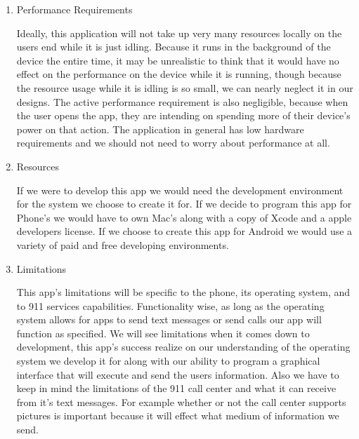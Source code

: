 \documentclass[12pt]{article}
\begin{document}
\begin{enumerate}
\item Performance Requirements

Ideally, this application will not take up very many resources locally on the users end while it is just idling. Because it runs in the background of the device the entire time, it may be unrealistic to think that it would have no effect on the performance on the device while it is running, though because the resource usage while it is idling is so small, we can nearly neglect it in our designs. The active performance requirement is also negligible, because when the user opens the app, they are intending on spending more of their device’s power on that action. The application in general has low hardware requirements and we should not need to worry about performance at all.

\item Resources

If we were to develop this app we would need the development environment for the system we choose to create it for. If we decide to program this app for Phone's we would have to own Mac’s along with a copy of Xcode and a apple developers license. If we choose to create this app for Android we would use a variety of paid and free developing environments.

\item Limitations

This app’s limitations will be specific to the phone, its operating system, and to 911 services capabilities. Functionality wise, as long as the operating system allows for apps to send text messages or send calls our app will function as specified. We will see limitations when it comes down to development, this app’s success realize on our understanding of the operating system we develop it for along with our ability to program a graphical interface that will execute and send the users information. Also we have to keep in mind the limitations of the 911 call center and what it can receive from it's text messages. For example whether or not the call center supports pictures is important because it will effect what medium of information we send.


\end{enumerate}


 
\end{document}
